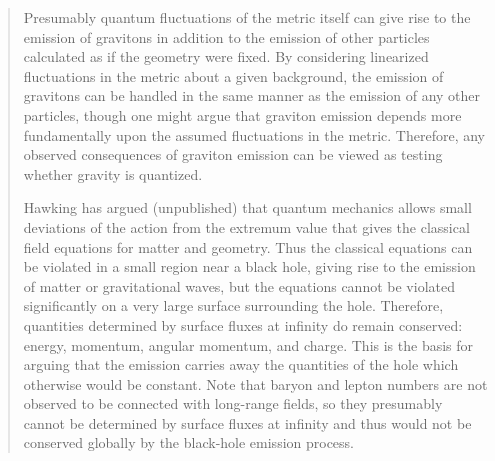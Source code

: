 \documentclass[12pt]{article} \usepackage{latexsym}
\begin{document}
\begin{quotation}
Presumably quantum fluctuations of the metric itself can give rise to
the emission of gravitons in addition to the emission of other
particles calculated as if the geometry were fixed.  By considering
linearized fluctuations in the metric about a given background, the
emission of gravitons can be handled in the same manner as the
emission of any other particles, though one might argue that graviton
emission depends more fundamentally upon the assumed fluctuations in
the metric.  Therefore, any observed consequences of graviton emission
can be viewed as testing whether gravity is quantized.

Hawking has argued (unpublished) that quantum mechanics allows small
deviations of the action from the extremum value that gives the
classical field equations for matter and geometry.  Thus the classical
equations can be violated in a small region near a black hole, giving
rise to the emission of matter or gravitational waves, but the
equations cannot be violated significantly on a very large surface
surrounding the hole.  Therefore, quantities determined by surface
fluxes at infinity do remain conserved: energy, momentum, angular
momentum, and charge.  This is the basis for arguing that the emission
carries away the quantities of the hole which otherwise would be
constant.  Note that baryon and lepton numbers are not observed to be
connected with long-range fields, so they presumably cannot be
determined by surface fluxes at infinity and thus would not be
conserved globally by the black-hole emission process.


\end{quotation}
\end{document}

